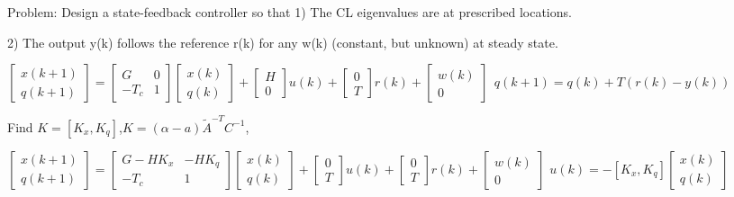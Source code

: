 \begin{multicols*}{3}
Problem: Design a state-feedback controller so that
1) The CL eigenvalues are at prescribed locations.

2) The output y(k) follows the reference r(k) for any w(k)
(constant, but unknown) at steady state.

$
 \begin{bmatrix} x(k+1) \\ q(k+1)\end{bmatrix} =
\begin{bmatrix}G & 0 \\ -T_c & 1\end{bmatrix}\begin{bmatrix}x(k) \\ q(k)\end{bmatrix}+
\begin{bmatrix}H \\ 0\end{bmatrix}u(k)+\begin{bmatrix} 0 \\ T\end{bmatrix}r(k)+\begin{bmatrix}w(k) \\ 0\end{bmatrix} \ \
q(k+1)=q(k)+T(r(k)-y(k)) 
$

Find $K = [K_x, K_q]$,$K=(\alpha-a)\tilde{A}^{-T}C^{-1}$,

$ \begin{bmatrix} x(k+1) \\ q(k+1)\end{bmatrix} =
\begin{bmatrix}G-HK_x & -HK_q \\ -T_c & 1\end{bmatrix}\begin{bmatrix}x(k) \\ q(k)\end{bmatrix}+
\begin{bmatrix}0 \\ T\end{bmatrix}u(k)+\begin{bmatrix} 0 \\ T\end{bmatrix}r(k)+\begin{bmatrix}w(k) \\ 0\end{bmatrix}$ $u(k)=-[K_x, K_q]\begin{bmatrix} x(k) \\ q(k)
\end{bmatrix}$ %



\end{multicols*}
